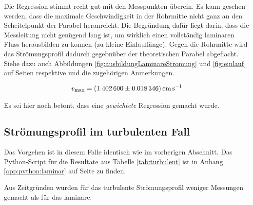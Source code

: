 Die  Regression  stimmt  recht  gut mit  den  Messpunkten  \"uberein. Es  kann
gesehen  werden, dass  die  maximale Geschwindigkeit  in  der Rohrmitte  nicht
ganz an  den Scheitelpunkt  der Parabel heranreicht. Die  Begr\"undung daf\"ur
liegt  darin, dass  die Messleitung  nicht  gen\"ugend lang  ist, um  wirklich
einen  vollst\"andig  laminaren  Fluss   herausbilden  zu  konnen  (zu  kleine
Einlaufl\"ange). Gegen  die  Rohrmitte   wird  das  Str\"omungsprofil  dadurch
gegebn\"uber der theoretischen Parabel abgeflacht. Siehe dazu auch Abbildungen
\ref{fig:ausbildungLaminareStromung}   und    \ref{fig:einlauf}   auf   Seiten
\pageref{fig:ausbildungLaminareStromung} respektive  \pageref{fig:einlauf} und
die zugeh\"origen Anmerkungen.

\begin{equation}
    \label{eq:profile:laminar:regression:results:vmax}
    v_{\mathrm{max}} = \SI{1.4026 \pm 0.018346}{\centi\meter\per\second}
\end{equation}

Es sei hier noch betont, dass eine \emph{gewichtete} Regression gemacht wurde.

\clearpage
\subsection{Str\"omungsprofil im turbulenten Fall}
\label{subsec:profil:turbulent}

Das Vorgehen ist  in diesem Falle identisch wie im  vorherigen Abschnitt.  Das
Python-Script  f\"ur  die Resultate  aus  Tabelle  \ref{tab:turbulent} ist  in
Anhang  \ref{app:python:laminar} auf  Seite \pageref{app:python:turbulent}  zu
finden.

Aus  Zeitgr\"unden  wurden  f\"ur  das  turbulente  Str\"omungsprofil  weniger
Messungen gemacht als f\"ur das laminare.

